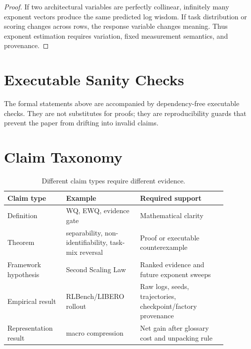 \documentclass[11pt]{article}
\begin{document}
\begin{proof}
If two architectural variables are perfectly collinear, infinitely many exponent vectors produce the same predicted log wisdom.
If task distribution or scoring changes across rows, the response variable changes meaning.
Thus exponent estimation requires variation, fixed measurement semantics, and provenance.
\end{proof}

\section{Executable Sanity Checks}

The formal statements above are accompanied by dependency-free executable checks.
They are not substitutes for proofs; they are reproducibility guards that prevent the paper from drifting into invalid claims.

\begin{table}[t]
\centering
\scriptsize
\caption{Executable formal checks generated by \texttt{wisdom\_science\_formal\_checks.py}.}

\end{table}

\section{Claim Taxonomy}

\begin{table}[t]
\centering
\small
\begin{tabular}{p{0.23\linewidth}p{0.30\linewidth}p{0.35\linewidth}}
\toprule
Claim type & Example & Required support \\
\midrule
Definition & WQ, EWQ, evidence gate & Mathematical clarity \\
Theorem & separability, non-identifiability, task-mix reversal & Proof or executable counterexample \\
Framework hypothesis & Second Scaling Law & Ranked evidence and future exponent sweeps \\
Empirical result & RLBench/LIBERO rollout & Raw logs, seeds, trajectories, checkpoint/factory provenance \\
Representation result & macro compression & Net gain after glossary cost and unpacking rule \\
\bottomrule
\end{tabular}
\caption{Different claim types require different evidence.}
\end{table}
\end{document}
